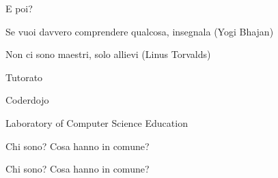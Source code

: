 \begin{frame}{E poi?}

\BI
\item Se vuoi davvero comprendere qualcosa, insegnala (Yogi Bhajan)
\item Non ci sono maestri, solo allievi (Linus Torvalds)
\EI

\BIL
\item Tutorato
\item Coderdojo
\item Laboratory of Computer Science Education
\EIL

\end{frame}

\begin{frame}{Chi sono? Cosa hanno in comune?}


\end{frame}

\begin{frame}{Chi sono? Cosa hanno in comune?}

\Huge
{}


\end{frame}




